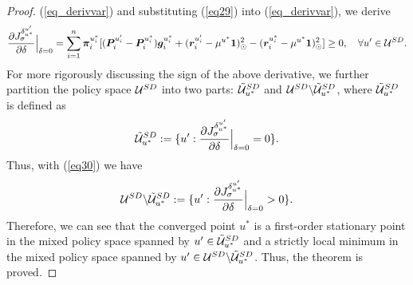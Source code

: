 \documentclass[10pt,a4paper]{amsart}
\begin{document}
\begin{proof}
(\ref{eq_derivvar}) and substituting (\ref{eq29}) into
(\ref{eq_derivvar}), we derive
\begin{equation}\label{eq30}
\frac{\partial J^{\delta^{u'}_{u^*}}_{\sigma}}{\partial \delta}
\Big|_{\delta=0} = \sum_{i=1}^{n} \bm \pi^{u^*_i}_i[(\bm P^{u'_i}_i
- \bm P^{u^*_i}_i)\bm g^{u^*_i}_i + (\bm r^{u'_i}_i - \mu^{u^*} \bm
1)^2_{\odot} - (\bm r^{u^*_i}_i - \mu^{u^*} \bm 1)^2_{\odot}] \geq
0, \quad \forall u' \in \mathcal U^{\rm SD}.
\end{equation}
For more rigorously discussing the sign of the above derivative, we
further partition the policy space $\mathcal U^{\rm SD}$ into two
parts: $\tilde{\mathcal U}^{\rm SD}_{u^*}$ and $\mathcal U^{\rm
SD}\backslash\tilde{\mathcal U}^{\rm SD}_{u^*}$, where
$\tilde{\mathcal U}^{\rm SD}_{u^*}$ is defined as
\begin{equation}\label{eq31}
\tilde{\mathcal U}^{\rm SD}_{u^*} := \{u' :  \frac{\partial
J^{\delta^{u'}_{u^*}}_{\sigma}}{\partial \delta} \Big|_{\delta=0} =
0\}.
\end{equation}
Thus, with (\ref{eq30}) we have
\begin{equation}
\mathcal U^{\rm SD}\backslash\tilde{\mathcal U}^{\rm SD}_{u^*} :=
\{u' :  \frac{\partial J^{\delta^{u'}_{u^*}}_{\sigma}}{\partial
\delta} \Big|_{\delta=0} > 0\}.
\end{equation}
Therefore, we can see that the converged point $u^*$ is a
first-order stationary point in the mixed policy space spanned by
$u' \in \tilde{\mathcal U}^{\rm SD}_{u^*}$ and a strictly local
minimum in the mixed policy space spanned by $u' \in \mathcal U^{\rm
SD}\backslash\tilde{\mathcal U}^{\rm SD}_{u^*}$. Thus, the theorem
is proved.
\end{proof}
\end{document}
